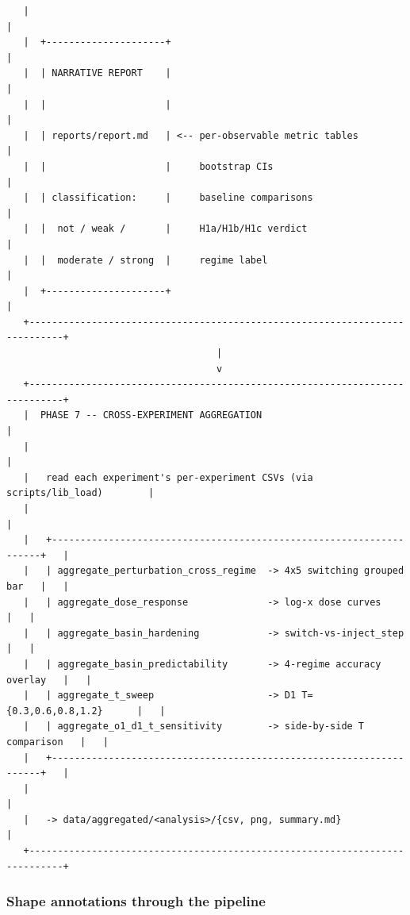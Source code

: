 \documentclass{article}
\theoremstyle{plain}
\theoremstyle{definition}
\begin{document}
\begin{verbatim}
   |                                                                            |
   |  +---------------------+                                                   |
   |  | NARRATIVE REPORT    |                                                   |
   |  |                     |                                                   |
   |  | reports/report.md   | <-- per-observable metric tables                  |
   |  |                     |     bootstrap CIs                                 |
   |  | classification:     |     baseline comparisons                          |
   |  |  not / weak /       |     H1a/H1b/H1c verdict                           |
   |  |  moderate / strong  |     regime label                                  |
   |  +---------------------+                                                   |
   +----------------------------------------------------------------------------+
                                     |
                                     v
   +----------------------------------------------------------------------------+
   |  PHASE 7 -- CROSS-EXPERIMENT AGGREGATION                                    |
   |                                                                            |
   |   read each experiment's per-experiment CSVs (via scripts/lib_load)        |
   |                                                                            |
   |   +--------------------------------------------------------------------+   |
   |   | aggregate_perturbation_cross_regime  -> 4x5 switching grouped bar   |   |
   |   | aggregate_dose_response              -> log-x dose curves           |   |
   |   | aggregate_basin_hardening            -> switch-vs-inject_step       |   |
   |   | aggregate_basin_predictability       -> 4-regime accuracy overlay   |   |
   |   | aggregate_t_sweep                    -> D1 T={0.3,0.6,0.8,1.2}      |   |
   |   | aggregate_o1_d1_t_sensitivity        -> side-by-side T comparison   |   |
   |   +--------------------------------------------------------------------+   |
   |                                                                            |
   |   -> data/aggregated/<analysis>/{csv, png, summary.md}                      |
   +----------------------------------------------------------------------------+
\end{verbatim}

\subsubsection{Shape annotations through the pipeline}
\end{document}
